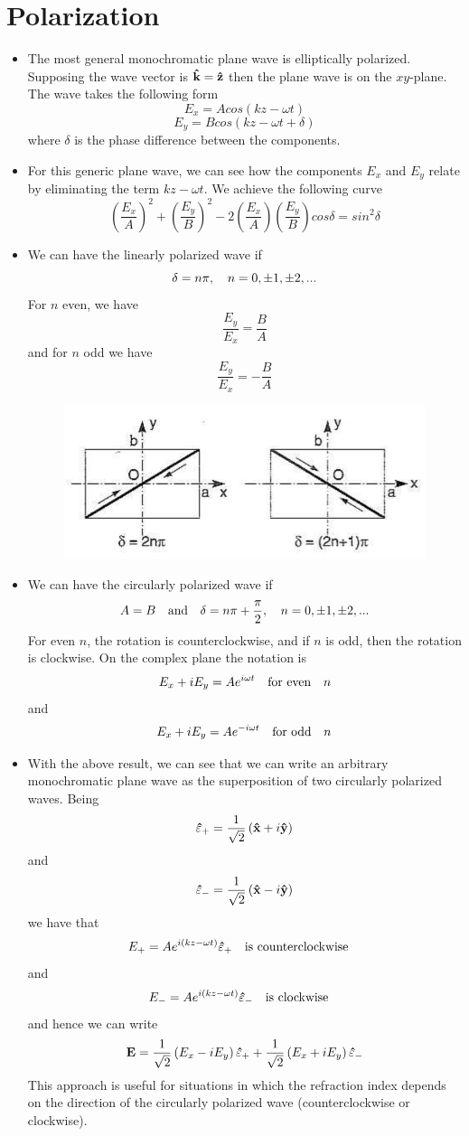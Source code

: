 \documentclass[oneside, 12pt]{book}
\begin{document}
\section{Polarization}
\begin{itemize}
    \item The most general monochromatic plane wave is elliptically polarized. Supposing the wave vector is $\vu{k} = \vu{z}$ then the plane wave is on the $xy$-plane. The wave takes the following form
    $$E_x = Acos\left(kz-\omega t\right)$$
    $$E_y = Bcos\left(kz-\omega t + \delta \right)$$
    where $\delta$ is the phase difference between the components.
    \item For this generic plane wave, we can see how the components $E_x$ and $E_y$ relate by eliminating the term $kz-\omega t$. We achieve the following curve
    $$\left(\frac{E_x}{A}\right)^2 + \left(\frac{E_y}{B}\right)^2 - 2\left(\frac{E_x}{A}\right)\left(\frac{E_y}{B}\right)cos\delta = sin^2\delta$$
    \item We can have the linearly polarized wave if
    $$\delta = n\pi \qc n=0,\pm1, \pm2,...$$
    For $n$ even, we have
    $$\frac{E_y}{E_x} = \frac{B}{A}$$
    and for $n$ odd we have
    $$\frac{E_y}{E_x} = -\frac{B}{A}$$
    \begin{figure}[H]
        \centering
        \includegraphics[width=\textwidth]{moyses4_fig_5-1}
    \end{figure}
    \item We can have the circularly polarized wave if
    $$A=B \qq{and} \delta =n\pi + \frac{\pi}{2}\qc n=0,\pm1,\pm2,...$$
    For even $n$, the rotation is counterclockwise, and if $n$ is odd, then the rotation is clockwise. On the complex plane the notation is
    $$E_x + iE_y = Ae^{i\omega t}\qq{for even} n$$
    and
    $$E_x + iE_y = Ae^{-i\omega t}\qq{for odd} n$$
    \item With the above result, we can see that we can write an arbitrary monochromatic plane wave as the superposition of two circularly polarized waves. Being
    $$\vu{\varepsilon}_+ = \frac{1}{\sqrt{2}}\left(\vu{x} + i\vu{y} \right)$$
    and
    $$\vu{\varepsilon}_- = \frac{1}{\sqrt{2}}\left(\vu{x} - i\vu{y} \right)$$
    we have that
    $$E_+ = Ae^{i(kz-\omega t)}\vu{\varepsilon}_+\qq{is counterclockwise}$$
    and
    $$E_- = Ae^{i(kz-\omega t)}\vu{\varepsilon}_-\qq{is clockwise}$$
    and hence we can write
    $$\vb{E} = \frac{1}{\sqrt{2}}\left(E_x-iE_y\right)\vu{\varepsilon}_+ +\frac{1}{\sqrt{2}}\left(E_x+iE_y\right)\vu{\varepsilon}_-$$
    This approach is useful for situations in which the refraction index depends on the direction of the circularly polarized wave (counterclockwise or clockwise).
\end{itemize}
\end{document}
